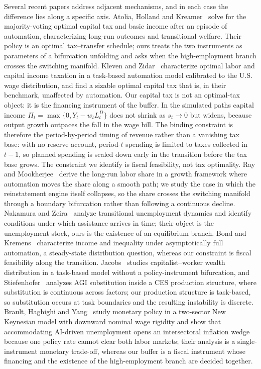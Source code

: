 \documentclass[review,12pt]{elsarticle}
\theoremstyle{plain}
\theoremstyle{definition}
\theoremstyle{remark}
\begin{document}
Several recent papers address adjacent mechanisms, and in each case the difference lies along a specific axis. Atolia, Holland and Kreamer~\cite{Atolia2024} solve for the majority-voting optimal capital tax and basic income after an episode of automation, characterizing long-run outcomes and transitional welfare. Their policy is an optimal tax--transfer schedule; ours treats the two instruments as parameters of a bifurcation unfolding and asks when the high-employment branch crosses the switching manifold. Kleven and Zidar~\cite{KlevenZidar2026} characterize optimal labor and capital income taxation in a task-based automation model calibrated to the U.S. wage distribution, and find a sizable optimal capital tax that is, in their benchmark, unaffected by automation. Our capital tax is not an optimal-tax object: it is the financing instrument of the buffer. In the simulated paths capital income $\Pi_t=\max\{0,Y_t-w_tL_t^D\}$ does not shrink as $s_t\to0$ but widens, because output growth outpaces the fall in the wage bill. The binding constraint is therefore the period-by-period timing of revenue rather than a vanishing tax base: with no reserve account, period-$t$ spending is limited to taxes collected in $t-1$, so planned spending is scaled down early in the transition before the tax base grows. The constraint we identify is fiscal feasibility, not tax optimality. Ray and Mookherjee~\cite{RayMookherjee2022} derive the long-run labor share in a growth framework where automation moves the share along a smooth path; we study the case in which the reinstatement engine itself collapses, so the share crosses the switching manifold through a boundary bifurcation rather than following a continuous decline. Nakamura and Zeira~\cite{NakamuraZeira2024} analyze transitional unemployment dynamics and identify conditions under which assistance arrives in time; their object is the unemployment stock, ours is the existence of an equilibrium branch. Bond and Kremens~\cite{BondKremens2024} characterize income and inequality under asymptotically full automation, a steady-state distribution question, whereas our constraint is fiscal feasibility along the transition. Jacobs~\cite{Jacobs2023} studies capitalist--worker wealth distribution in a task-based model without a policy-instrument bifurcation, and Stiefenhofer~\cite{Stiefenhofer2025} analyzes AGI substitution inside a CES production structure, where substitution is continuous across factors; our production structure is task-based, so substitution occurs at task boundaries and the resulting instability is discrete. Brault, Haghighi and Yang~\cite{BHY2026} study monetary policy in a two-sector New Keynesian model with downward nominal wage rigidity and show that accommodating AI-driven unemployment opens an intersectoral inflation wedge because one policy rate cannot clear both labor markets; their analysis is a single-instrument monetary trade-off, whereas our buffer is a fiscal instrument whose financing and the existence of the high-employment branch are decided together.
\end{document}
